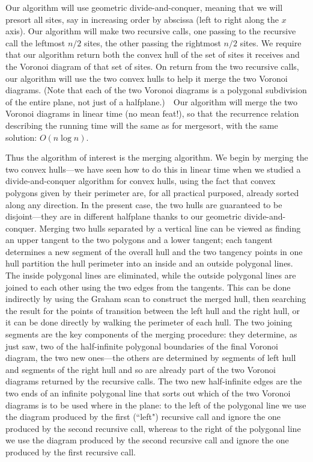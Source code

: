 \documentclass[11pt]{article}
\begin{document}
Our algorithm will use geometric divide-and-conquer, meaning that we will
presort all sites, say in increasing order by abscissa (left to right along
the $x$ axis).  Our algorithm will make two recursive calls, one passing
to the recursive call the leftmost $n/2$ sites, the other passing the rightmost
$n/2$ sites.  We require that our algorithm return both the convex hull of the
set of sites it receives and the Voronoi diagram of that set of sites.
On return from the two recursive calls, our algorithm will use the two
convex hulls to help it merge the two Voronoi diagrams.   (Note that each of
the two Voronoi diagrams is a polygonal subdivision of the entire plane,
not just of a halfplane.)\ \ Our algorithm will merge the two Voronoi diagrams
in linear time (no mean feat!), so that the recurrence relation describing the
running time will the same as for mergesort, with the same solution:
$O(n\log n)$.

Thus the algorithm of interest is the merging algorithm.  We begin by
merging the two convex hulls---we have seen how to do this in linear time
when we studied a divide-and-conquer algorithm for convex hulls, using the
fact that convex polygons given by their perimeter are, for all practical
purposed, already sorted along any direction.   In the present case, the
two hulls are guaranteed to be disjoint---they are in different halfplane
thanks to our geometric divide-and-conquer. Merging two hulls separated
by a vertical line can be viewed as finding an upper tangent to the two
polygons and a lower tangent; each tangent determines a new segment of the
overall hull and the two tangency points in one hull partition the hull
perimeter into an inside and an outside polygonal lines.  The inside
polygonal lines are eliminated, while the outside polygonal lines are
joined to each other using the two edges from the tangents.  This can
be done indirectly by using the Graham scan to construct the merged hull,
then searching the result for the points of transition between the left hull
and the right hull, or it can be done directly by walking the perimeter
of each hull.  The two joining segments are the key components of the
merging procedure: they determine, as just saw, two of the half-infinite
polygonal boundaries of the final Voronoi diagram, the two new ones---the
others are determined by segments of left hull and segments of the right
hull and so are already part of the two Voronoi diagrams returned by the
recursive calls.   The two new half-infinite edges are the two ends of
an infinite polygonal line that sorts out which of the two Voronoi
diagrams is to be used where in the plane: to the left of the polygonal
line we use the diagram produced by the first (``left") recursive call
and ignore the one produced by the second recursive call, whereas to the
right of the polygonal line we use the diagram produced by the second
recursive call and ignore the one produced by the first recursive call.
\end{document}
